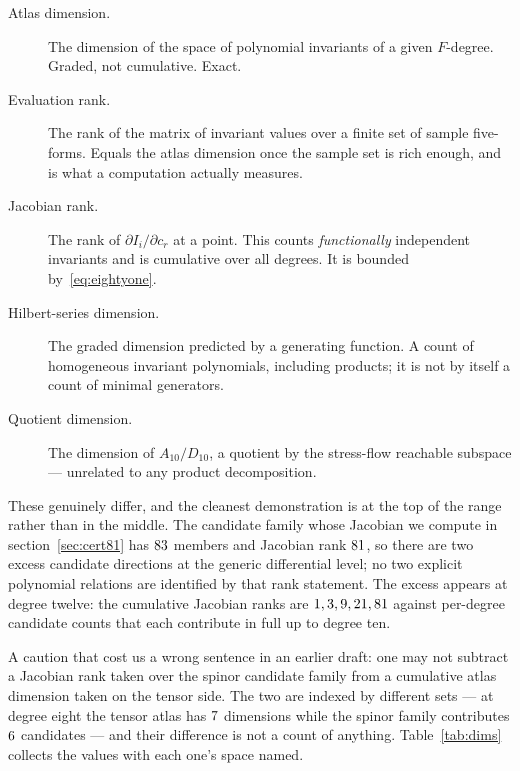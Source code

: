 \documentclass[11pt,a4paper]{article}
\begin{document}
\begin{description}
\item[Atlas dimension.] The dimension of the space of polynomial invariants of a
  given $F$-degree. Graded, not cumulative. Exact.
\item[Evaluation rank.] The rank of the matrix of invariant values over a finite
  set of sample five-forms. Equals the atlas dimension once the sample set is
  rich enough, and is what a computation actually measures.
\item[Jacobian rank.] The rank of $\partial I_i/\partial c_r$ at a point. This
  counts \emph{functionally} independent invariants and is cumulative over all
  degrees. It is bounded by~\eqref{eq:eightyone}.
\item[Hilbert-series dimension.] The graded dimension predicted by a generating
  function. A count of homogeneous invariant polynomials, including products; it is not by itself a count of minimal generators.
\item[Quotient dimension.] The dimension of $A_{10}/D_{10}$, a quotient by the
  stress-flow reachable subspace --- unrelated to any product decomposition.
\end{description}

These genuinely differ, and the cleanest demonstration is at the top of the
range rather than in the middle. The candidate family whose Jacobian we compute
in section~\ref{sec:cert81} has $83$ members and Jacobian rank
$81$, so there are two excess candidate directions at the generic differential level;
no two explicit polynomial relations are identified by that rank statement.
The excess appears at degree twelve: the
cumulative Jacobian ranks are $1, 3,
9, 21, 81$ against per-degree candidate
counts that each contribute in full up to degree ten.

A caution that cost us a wrong sentence in an earlier draft: one may not subtract
a Jacobian rank taken over the spinor candidate family from a cumulative atlas
dimension taken on the tensor side. The two are indexed by different sets --- at
degree eight the tensor atlas has $7$ dimensions while the
spinor family contributes $6$ candidates --- and their
difference is not a count of anything. Table~\ref{tab:dims} collects the values
with each one's space named.



\end{document}
